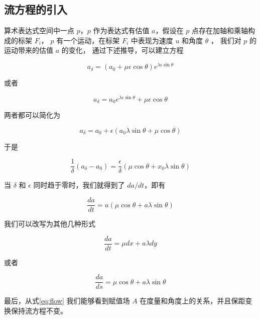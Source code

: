 \documentclass[a4paper,12pt]{article}
\numberwithin{definition}{section}
\numberwithin{lemma}{section}
\numberwithin{proposition}{section}
\numberwithin{theorem}{section}
\numberwithin{grammar}{section}
\numberwithin{program}{section}
\numberwithin{convention}{section}
\numberwithin{corollary}{section}
\begin{document}
\subsection{流方程的引入}

算术表达式空间中一点 $p$，$p$ 作为表达式有估值 $a$，假设在 $p$ 点存在加轴和乘轴构成的标架 $F_i$，
$p$ 有一个运动，在标架 $F_i$ 中表现为速度 $u$ 和角度 $\theta$ ， 我们对 $p$ 的运动带来的估值 $a$ 的变化，
通过下述推导，可以建立方程

\begin{equation}
    a_{\delta} = (a_0 + \mu \epsilon \cos \theta)e^{\lambda \epsilon \sin \theta}
\end{equation}

或者

\begin{equation}
    a_{\delta} = a_0 e^{\lambda \epsilon \sin \theta} + \mu \epsilon \cos \theta
\end{equation}

两者都可以简化为

\begin{equation}
    a_{\delta} = a_0 + \epsilon (a_0 \lambda \sin \theta + \mu \cos \theta)
\end{equation}

于是

\begin{equation}
    \frac{1}{\delta} (a_{\delta} - a_0) = \frac{\epsilon}{\delta} (\mu \cos \theta + x_0 \lambda \sin \theta)
\end{equation}

当 $\delta$ 和 $\epsilon$ 同时趋于零时，我们就得到了 $da / dt$，即有

\begin{equation}
    \frac{da}{dt} = u (\mu \cos \theta + a \lambda \sin \theta)
\end{equation}

我们可以改写为其他几种形式

\begin{equation}
    \frac{da}{dt} = \mu dx + a \lambda dy
\end{equation}

或者

\begin{equation}
    \frac{da}{ds} = \mu \cos \theta + a \lambda \sin \theta\label{eq:flow}
\end{equation}

最后，从式\eqref{eq:flow} 我们能够看到赋值场 $A$ 在度量和角度上的关系，并且保距变换保持流方程不变。
\end{document}
